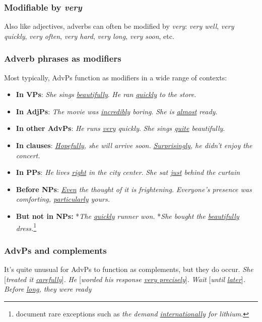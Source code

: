 \subsubsection*{Modifiable by \textit{very}}
Also like adjectives, adverbs can often be modified by \textit{very}: \textit{very well}, \textit{very quickly}, \textit{very often}, \textit{very hard}, \textit{very long}, \textit{very soon}, etc.

\subsubsection*{Adverb phrases as modifiers}

Most typically, AdvPs function as modifiers in a wide range of contexts:

\begin{itemize}
    \item \textbf{In VPs}: \textit{She sings \uline{beautifully}}. \textit{He ran \uline{quickly} to the store}.
    \item \textbf{In AdjPs}: \textit{The movie was \uline{incredibly} boring}. \textit{She is \uline{almost} ready}.
    \item \textbf{In other AdvPs}: \textit{He runs \uline{very} quickly}.  \textit{She sings \uline{quite} beautifully}.
    \item \textbf{In clauses}: \textit{\uline{Hopefully}, she will arrive soon.} \textit{\uline{Surprisingly}, he didn't enjoy the concert.}
    \item \textbf{In PPs}: \textit{He lives \uline{right} in the city center}. \textit{She sat \uline{just} behind the curtain}
    \item \textbf{Before NPs}: \textit{\uline{Even} the thought of it is frightening.} \textit{Everyone's presence was comforting, \uline{particularly} yours.}
    \item \textbf{But not in NPs:} *\textit{The \uline{quickly} runner won.} *\textit{She bought the \uline{beautifully} dress.}\footnote{\citet{payne2010} document rare exceptions such as \textit{the demand \uline{internationally} for lithium}.}
\end{itemize}

\subsubsection*{AdvPs and complements} \label{sec:AdvPs+Comps}
It's quite unusual for AdvPs to function as complements, but they do occur. \textit{She }[\textit{treated it \uline{carefully}}]\textit{.} \textit{He }[\textit{worded his response \uline{very precisely}}]\textit{.} \textit{Wait }[\textit{until \uline{later}}]\textit{.} \textit{{\ob}Before \uline{long}{\cb}, they were ready}

